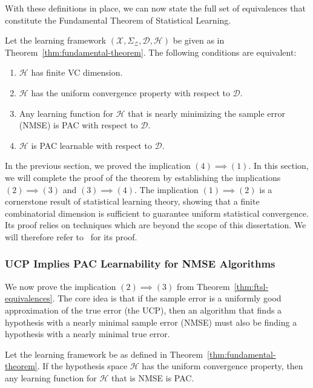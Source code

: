 With these definitions in place, we can now state the full set of equivalences that constitute the Fundamental Theorem of Statistical Learning.

\begin{theorem}
    \label{thm:ftsl-equivalences}
    Let the learning framework $(\mathcal{X}, \Sigma_{\mathcal{Z}}, \mathcal{D}, \mathcal{H})$ be given as in Theorem~\ref{thm:fundamental-theorem}. The following conditions are equivalent:
    \begin{enumerate}
        \item $\mathcal{H}$ has finite VC dimension.
        \item $\mathcal{H}$ has the uniform convergence property with respect to $\mathcal{D}$.
        \item Any learning function for $\mathcal{H}$ that is nearly minimizing the sample error (NMSE) is PAC with respect to $\mathcal{D}$.
        \item $\mathcal{H}$ is PAC learnable with respect to $\mathcal{D}$.
    \end{enumerate}
\end{theorem}

\begin{remark}
    In the previous section, we proved the implication $(4) \implies (1)$. In this section, we will complete the proof of the theorem by establishing the implications $(2) \implies (3)$ and $(3) \implies (4)$. The implication $(1) \implies (2)$ is a cornerstone result of statistical learning theory, showing that a finite combinatorial dimension is sufficient to guarantee uniform statistical convergence. Its proof relies on techniques which are beyond the scope of this dissertation. We will therefore refer to~\cite[\S 3]{KrappWirth2021} for its proof.
\end{remark}

\subsubsection{UCP Implies PAC Learnability for NMSE Algorithms}

We now prove the implication $(2) \implies (3)$ from Theorem~\ref{thm:ftsl-equivalences}. The core idea is that if the sample error is a uniformly good approximation of the true error (the UCP), then an algorithm that finds a hypothesis with a nearly minimal sample error (NMSE) must also be finding a hypothesis with a nearly minimal true error.

\begin{theorem}
    Let the learning framework be as defined in Theorem~\ref{thm:fundamental-theorem}. If the hypothesis space $\mathcal{H}$ has the uniform convergence property, then any learning function for $\mathcal{H}$ that is NMSE is PAC.
\end{theorem}

